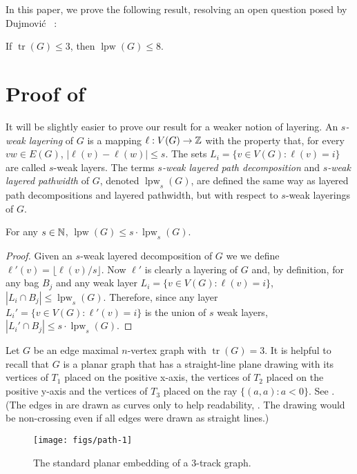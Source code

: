 \documentclass{patmorin}
\DeclareMathOperator{\tr}{tr}
\DeclareMathOperator{\lpw}{lpw}
\begin{document}
In this paper, we prove the following result, resolving an open question
posed by Dujmovi\'c \etal\ \cite{djsksk}:

\begin{thm}
  If $\tr(G)\le 3$, then $\lpw(G)\le 8$.
\end{thm}

\section{Proof of }

It will be slightly easier to prove our result for a weaker notion
of layering.  An \emph{$s$-weak layering} of $G$ is a mapping
$\ell:V(G)\to\mathbb{Z}$ with the property that, for every $vw\in E(G)$,
$|\ell(v)-\ell(w)|\le s$.  The sets $L_i=\{v\in V(G): \ell(v)=i\}$
are called $s$-weak layers.  The terms \emph{$s$-weak layered path
decomposition} and \emph{$s$-weak layered pathwidth} of $G$, denoted
$\lpw_s(G)$, are defined the same way as layered path decompositions
and layered pathwidth, but with respect to $s$-weak layerings of $G$.

\begin{lem}
  For any $s\in\mathbb{N}$, $\lpw(G) \le s\cdot\lpw_s(G)$.
\end{lem}

\begin{proof}
  Given an $s$-weak layered decomposition of $G$ we we define
  $\ell'(v)=\lfloor\ell(v)/s\rfloor$. Now $\ell'$ is clearly a layering of $G$ and, by definition, for any bag $B_j$ and any weak layer $L_i=\{v\in V(G):\ell(v)=i\}$, $|L_i\cap B_j|\le \lpw_s(G)$.  Therefore, since
  any layer $L_i'=\{v\in V(G):\ell'(v)=i\}$ is the union of $s$ weak layers,
  $|L_i'\cap B_j|\le s\cdot\lpw_s(G)$.
\end{proof}

Let $G$ be an edge maximal $n$-vertex graph with $\tr(G)=3$.  It is
helpful to recall that $G$ is a planar graph that has a straight-line
plane drawing with its vertices of $T_1$ placed on the positive x-axis,
the vertices of $T_2$ placed on the positive y-axis and the vertices of
$T_3$ placed on the ray $\{(a,a):a<0\}$. See . (The
edges in  are drawn as curves only to help readability,
. The drawing would be non-crossing even if all edges were drawn as
straight lines.)

\begin{figure}
  \begin{center}
     \texttt{[image: figs/path-1]}
  \end{center}
  \caption{The standard planar embedding of a 3-track graph.}
\end{figure}
\end{document}
